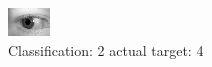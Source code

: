 \begin{figure}[h!]
\begin{center}
\includegraphics[width=0.60\columnwidth]{figures/ID809_class_2_target_4.png}
\end{center}
\caption{ Classification: 2 actual target: 4}
\label{fig:ID809_class_2_target_4}
\end{figure}
